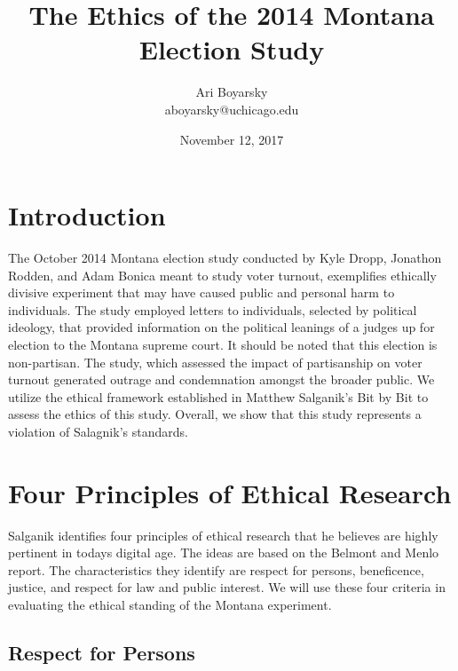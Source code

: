\documentclass[12pt]{article}
\begin{document}

\title{The Ethics of the 2014 Montana Election Study}
\author{Ari Boyarsky \\ aboyarsky@uchicago.edu}
\date{November 12, 2017}



\maketitle


\section{Introduction}

The October 2014 Montana election study conducted by Kyle Dropp, Jonathon Rodden, and Adam Bonica meant to study voter turnout, exemplifies ethically divisive experiment that may have caused public and personal harm to individuals. The study employed letters to individuals, selected by political ideology, that provided information on the political leanings of a judges up for election to the Montana supreme court. It should be noted that this election is non-partisan. The study, which assessed the impact of partisanship on voter turnout generated outrage and condemnation amongst the broader public. We utilize the ethical framework established in Matthew Salganik’s Bit by Bit to assess the ethics of this study. Overall, we show that this study represents a violation of Salagnik’s standards.  

\section{Four Principles of Ethical Research}

Salganik identifies four principles of ethical research that he believes are highly pertinent in todays digital age. The ideas are based on the Belmont and Menlo report. The characteristics they identify are respect for persons, beneficence, justice, and respect for law and public interest. We will use these four criteria in evaluating the ethical standing of the Montana experiment. 

\subsection{Respect for Persons}
\end{document}
